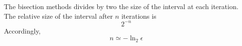 \documentclass[aps,12pt]{revtex4}
\begin{document}
The bisection methods divides by two the size of the interval at each iteration.
The relative size of the interval after $n$ iterations is
$$
	 2^{-n}
$$
Accordingly, 
$$
	n \simeq -\ln_2 \epsilon
$$
\end{document}
